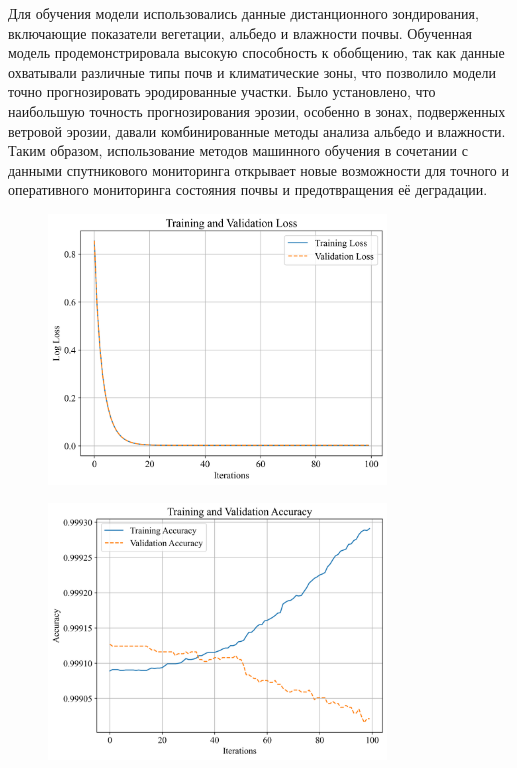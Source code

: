 Для обучения модели использовались данные дистанционного зондирования,
включающие показатели вегетации, альбедо и влажности почвы. Обученная
модель продемонстрировала высокую способность к обобщению, так как
данные охватывали различные типы почв и климатические зоны, что
позволило модели точно прогнозировать эродированные участки. Было
установлено, что наибольшую точность прогнозирования эрозии, особенно в
зонах, подверженных ветровой эрозии, давали комбинированные методы
анализа альбедо и влажности. Таким образом, использование методов
машинного обучения в сочетании с данными спутникового мониторинга
открывает новые возможности для точного и оперативного мониторинга
состояния почвы и предотвращения её деградации.


\begin{figure}[H]
	\centering
	\includegraphics[width=0.8\textwidth]{media/ict/image39}
	\caption*{}
\end{figure}

\begin{figure}[H]
	\centering
	\includegraphics[width=0.8\textwidth]{media/ict/image40}
	\caption*{}
\end{figure}


